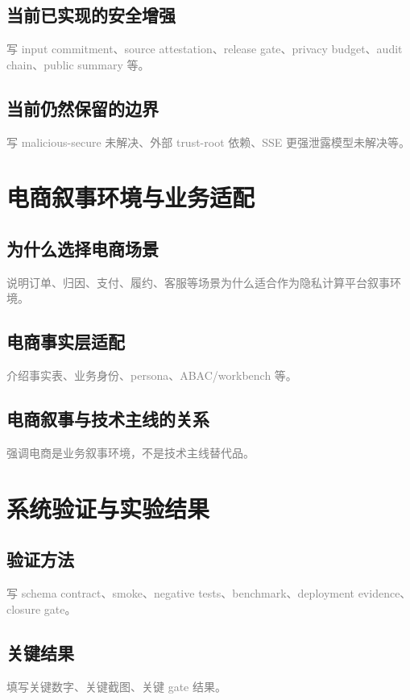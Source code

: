 \documentclass[UTF8,a4paper,12pt,oneside]{ctexrep}
\newcommand{\placeholder}[1]{\textcolor{gray}{#1}}
\begin{document}
\section{当前已实现的安全增强}
\placeholder{写 input commitment、source attestation、release gate、privacy budget、audit chain、public summary 等。}

\section{当前仍然保留的边界}
\placeholder{写 malicious-secure 未解决、外部 trust-root 依赖、SSE 更强泄露模型未解决等。}

\chapter{电商叙事环境与业务适配}

\section{为什么选择电商场景}
\placeholder{说明订单、归因、支付、履约、客服等场景为什么适合作为隐私计算平台叙事环境。}

\section{电商事实层适配}
\placeholder{介绍事实表、业务身份、persona、ABAC/workbench 等。}

\section{电商叙事与技术主线的关系}
\placeholder{强调电商是业务叙事环境，不是技术主线替代品。}

\chapter{系统验证与实验结果}

\section{验证方法}
\placeholder{写 schema contract、smoke、negative tests、benchmark、deployment evidence、closure gate。}

\section{关键结果}
\placeholder{填写关键数字、关键截图、关键 gate 结果。}
\end{document}

